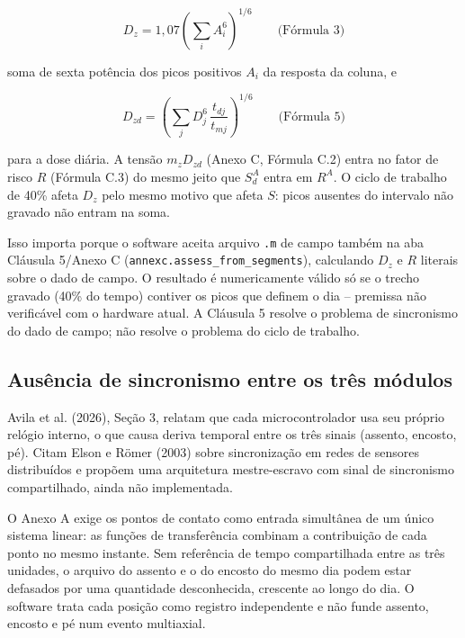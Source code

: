 \documentclass[11pt,a4paper]{article}
\newcommand{\code}[1]{\texttt{\small #1}}
\begin{document}
\begin{equation}
D_z = 1{,}07\left(\sum_i A_i^{6}\right)^{1/6}
\qquad \text{(Fórmula 3)}
\end{equation}

soma de sexta potência dos picos positivos $A_i$ da resposta da coluna, e

\begin{equation}
D_{zd} = \left(\sum_j D_j^{6}\,\frac{t_{dj}}{t_{mj}}\right)^{1/6}
\qquad \text{(Fórmula 5)}
\end{equation}

para a dose diária. A tensão $m_z D_{zd}$ (Anexo C, Fórmula C.2) entra no
fator de risco $R$ (Fórmula C.3) do mesmo jeito que $S_d^A$ entra em
$R^A$. O ciclo de trabalho de 40\% afeta $D_z$ pelo mesmo motivo que afeta
$S$: picos ausentes do intervalo não gravado não entram na soma.

Isso importa porque o software aceita arquivo \code{.m} de campo também na
aba Cláusula 5/Anexo C (\code{annexc.assess\_from\_segments}), calculando
$D_z$ e $R$ literais sobre o dado de campo. O resultado é numericamente
válido só se o trecho gravado (40\% do tempo) contiver os picos que
definem o dia -- premissa não verificável com o hardware atual. A
Cláusula 5 resolve o problema de sincronismo do dado de campo; não resolve
o problema do ciclo de trabalho.

\subsection{Ausência de sincronismo entre os três módulos}
\label{sec:sync}

Avila et al. (2026), Seção 3, relatam que cada microcontrolador usa seu
próprio relógio interno, o que causa deriva temporal entre os três sinais
(assento, encosto, pé). Citam Elson e Römer (2003) sobre sincronização em
redes de sensores distribuídos e propõem uma arquitetura mestre-escravo
com sinal de sincronismo compartilhado, ainda não implementada.

O Anexo A exige os pontos de contato como entrada simultânea de um único
sistema linear: as funções de transferência combinam a contribuição de
cada ponto no mesmo instante. Sem referência de tempo compartilhada entre
as três unidades, o arquivo do assento e o do encosto do mesmo dia podem
estar defasados por uma quantidade desconhecida, crescente ao longo do
dia. O software trata cada posição como registro independente e não funde
assento, encosto e pé num evento multiaxial.
\end{document}
